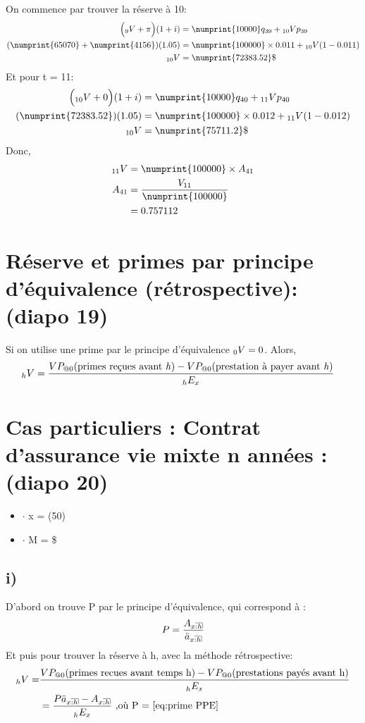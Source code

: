 \documentclass[11pt,french]{report}
\makeatletter
\DeclareRobustCommand{\annuity}[1]{%
\def\arraystretch{0}%
\setlength\arraycolsep{.7pt}%
\setlength\arrayrulewidth{.3pt}%
\begin{array}[b]{@{}c|}\hline
\\[\arraycolsep]%
\scriptstyle #1%
\end{array}%
}
\newcommand{\indiceGauche}[2]{{\vphantom{#2}}_{#1}#2}
\makeatother
\begin{document}
On commence par trouver la réserve à 10:
\begin{align*}
\Big(\indiceGauche{9}{V} + \pi \Big)(1+i) &= \numprint{10000} q_{39} + \indiceGauche{10}{V}p_{39}\\
(\numprint{65070} + \numprint{4156})(1.05) &= \numprint{100000} \times 0.011 + \indiceGauche{10}{V}(1 - 0.011) \\
\indiceGauche{10}{V}&= \numprint{72383.52}\$
\end{align*}
Et pour t = 11:
\begin{align*}
\Big(\indiceGauche{10}{V} + 0 \Big)(1+i) &= \numprint{10000} q_{40} + \indiceGauche{11}{V}p_{40}\\
(\numprint{72383.52})(1.05) &= \numprint{100000} \times 0.012 + \indiceGauche{11}{V}(1 - 0.012) \\
\indiceGauche{10}{V}&= \numprint{75711.2}\$
\end{align*}
Donc,
\begin{align*}
\indiceGauche{11}{V} &= \numprint{100000}\times A_{41}\\
A_{41} &= \frac{V_{11}}{\numprint{100000}}\\
&=0.757112
\end{align*}
\section{Réserve et primes par principe d'équivalence (rétrospective): (diapo 19)}
Si on utilise une prime par le principe d'équivalence $\indiceGauche{0}{V} = 0$. Alors,
\begin{align*}
\indiceGauche{h}{V} &= \frac{VP_{@0}(\text{primes reçues avant \emph{h}})- VP_{@0}(\text{prestation à payer avant \emph{h}})}{\indiceGauche{h}{E}_x}
\end{align*}
\section{Cas particuliers : Contrat d'assurance vie mixte n années : (diapo 20)}

\begin{itemize}
\item $ \cdot $ x = (50)
\item $ \cdot $ M = \$
\end{itemize}
\subsection*{i)}
D'abord on trouve P par le principe d'équivalence, qui correspond à :
\begin{equation}
\label{eq:prime PPE}
P = \frac{A_{x\annuity{:h}}}{\ddot{a}_{x\annuity{:h}}}
\end{equation}
Et puis pour trouver la réserve à h, avec la méthode rétrospective:
\begin{align*}
\indiceGauche{h}{V} =& \frac{VP_{@0}\text{(primes recues avant temps h)} - VP_{@0} \text{(prestations payés avant h)} }{\indiceGauche{h}{E_x}}\\
&= \frac{P \ddot{a}_{x\annuity{:h}} -  A_{x\annuity{:h}}}{\indiceGauche{h}{E_x}} \text{ ,où P = \ref{eq:prime PPE}}
\end{align*}
\end{document}
